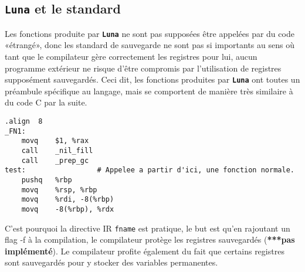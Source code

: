 \documentclass{article}
\newcommand{\luna}{\textbf{\texttt{Luna}}}
\begin{document}
\newpage
\subsection{\luna{} et le standard}
Les fonctions produite par \luna{} ne sont pas supposées être appelées par du code «étrangé», donc les standard de sauvegarde ne sont pas si importants au sens où tant que le compilateur gère correctement les registres pour lui, aucun programme extérieur ne risque d'être compromis par l'utilisation de registres supposément sauvegardés. Ceci dit, les fonctions produites par \luna{} ont toutes un préambule spécifique au langage, mais se comportent de manière très similaire à du code C par la suite.
\begin{center}
  \begin{lstlisting}[style=out]
    	.align	8
_FN1:
	movq	$1, %rax
	call	_nil_fill
	call	_prep_gc
test:                 # Appelee a partir d'ici, une fonction normale.
	pushq	%rbp
	movq	%rsp, %rbp
	movq	%rdi, -8(%rbp)
	movq	-8(%rbp), %rdx
  \end{lstlisting}
\end{center}
C'est pourquoi la directive IR \texttt{fname} est pratique, le but est qu'en rajoutant un flag -f à la compilation, le compilateur protège les registres sauvegardés (\textbf{\color{red}***pas implémenté}). Le compilateur profite également du fait que certains registres sont sauvegardés pour y stocker des variables permanentes.
\end{document}
